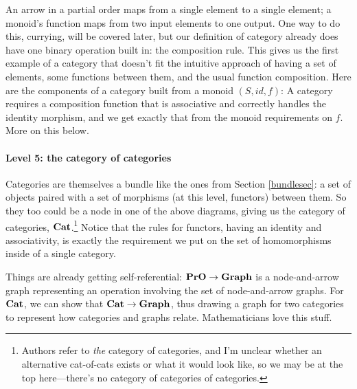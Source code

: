 \documentclass[11pt]{article}
\begin{document}
An arrow in a partial order maps from a single element to a single element; a monoid's
function maps from two input elements to one output. One way to do this, currying, will be
covered later, but our definition of category already does have one binary operation
built in: the composition rule. This gives us the first example of a category that
doesn't fit the intuitive approach of having a set of elements, some functions between
them, and the usual function composition. Here are the components of a category built
from a monoid $(S, id, f)$:
A category requires a composition function that is associative and correctly handles the
identity morphism, and we get exactly that from the monoid requirements on $f$. More on
this below.

\paragraph{Level 5: the category of categories}
Categories are themselves a bundle like the ones from Section \ref{bundlesec}: a set
of objects paired with a set of morphisms (at this level, functors) between them. So
they too could be a node in one of the above diagrams, giving us the category of
categories, ${\bf Cat}$.\footnote{Authors refer to {\em the} category of categories,
and I'm unclear whether an alternative cat-of-cats exists or what it would look like,
so we may be at the top here---there's no category of categories of categories.}
Notice that the rules for functors, having an identity and associativity, is exactly the
requirement we put on the set of homomorphisms inside of a single category.

Things are already getting self-referential: ${\bf PrO}\to {\bf Graph}$ is a
node-and-arrow graph representing an operation involving the set of node-and-arrow
graphs. For ${\bf Cat}$, we can show that ${\bf Cat}\to {\bf Graph}$, thus drawing a
graph for two categories to represent how categories and graphs relate.  Mathematicians
love this stuff.
\end{document}
